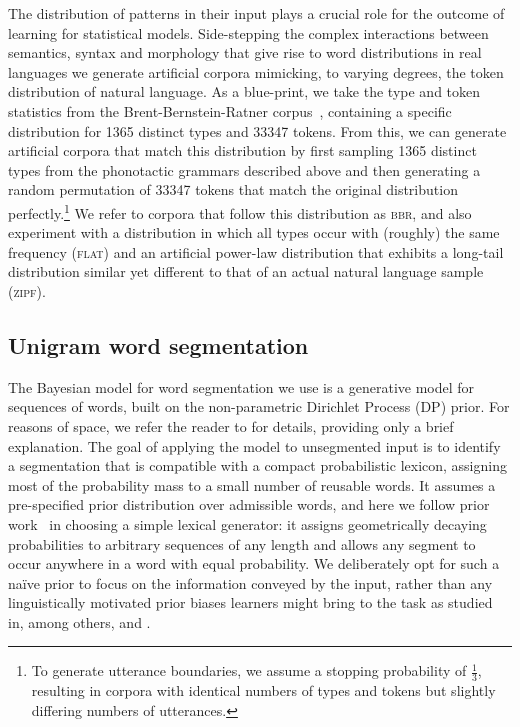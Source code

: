 \documentclass[11pt]{article}
\begin{document}
The distribution of patterns in their input plays a crucial role for the outcome of learning for statistical models. Side-stepping the complex interactions between semantics, syntax and morphology that give rise to word distributions in real languages we generate artificial corpora mimicking, to varying degrees, the token distribution of natural language. As a blue-print, we take the type and token statistics from the Brent-Bernstein-Ratner corpus~\cite{Brent99a}, containing a specific distribution for 1365 distinct types and 33347 tokens. From this, we can generate artificial corpora that match this distribution by first sampling 1365 distinct types from the phonotactic grammars described above and then generating a random permutation of 33347 tokens that match the original distribution perfectly.\footnote{To generate utterance boundaries, we assume a stopping probability of $\frac{1}{3}$, resulting in corpora with identical numbers of types and tokens but slightly differing numbers of utterances.} We refer to corpora that follow this distribution as \textsc{bbr}, and also experiment with a distribution in which all types occur with (roughly) the same frequency (\textsc{flat}) and an artificial power-law distribution that exhibits a long-tail distribution similar yet different to that of an actual natural language sample (\textsc{zipf}). 

\subsection{Unigram word segmentation}

The Bayesian model for word segmentation we use is a generative model for sequences of words, built on the non-parametric Dirichlet Process (DP) prior. For reasons of space, we refer the reader to \cite{Goldwater07c} for details, providing only a brief explanation. The goal of applying the model to unsegmented input is to identify a segmentation that is compatible with a compact probabilistic lexicon, assigning most of the probability mass to a small number of reusable words. It assumes a pre-specified prior distribution over admissible words, and here we follow prior work~\cite{Brent99a,Goldwater07c} in choosing a simple lexical generator: it assigns geometrically decaying probabilities to arbitrary sequences of any length and allows any segment to occur anywhere in a word with equal probability. We deliberately opt for such a na\"{i}ve prior to focus on the information conveyed by the input, rather than any linguistically motivated prior biases learners might bring to the task as studied in, among others, \cite{Johnson09a} and \cite{Borschinger12b}.
\end{document}
